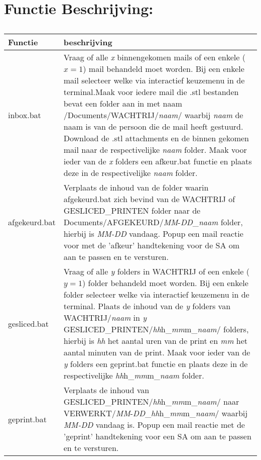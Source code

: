 \documentclass{article}
\begin{document}
\section*{\hspace{-1cm}Functie Beschrijving:}
\begin{table}[H]
    \centering
    \begin{tabular}%
    {>{\raggedright\arraybackslash}p{}%
    |>{\raggedright\arraybackslash}p{}}
    \rowcolor{myblue}
    Functie & beschrijving\\\hline
    inbox.bat & Vraag of alle \textit{x} binnengekomen mails of een enkele ($x=1$) mail behandeld moet worden. Bij een enkele mail selecteer welke via interactief keuzemenu in de terminal.\newline Maak voor iedere mail die .stl bestanden bevat een folder aan in met naam /Documents/WACHTRIJ/\textit{naam}/ waarbij \textit{naam} de naam is van de persoon die de mail heeft gestuurd. Download de .stl attachments en de binnen gekomen mail naar de respectivelijke \textit{naam} folder. Maak voor ieder van de \textit{x} folders een afkeur.bat functie en plaats deze in de respectivelijke \textit{naam} folder.\\


    afgekeurd.bat & Verplaats de inhoud van de folder waarin afgekeurd.bat zich bevind van de WACHTRIJ of GESLICED\_PRINTEN folder naar de Documents/AFGEKEURD/\textit{MM}-\textit{DD}\_\textit{naam} folder, hierbij is \textit{MM-DD} vandaag. Popup een mail reactie voor met de 'afkeur' handtekening voor de SA om aan te passen en te versturen.\\
    gesliced.bat & Vraag of alle \textit{y} folders in WACHTRIJ of een enkele ($y=1$) folder behandeld moet worden. Bij een enkele folder selecteer welke via interactief keuzemenu in de terminal. Plaats de inhoud van de \textit{y} folders van WACHTRIJ/\textit{naam} in \textit{y} GESLICED\_PRINTEN/\textit{hh}h\_\textit{mm}m\_\textit{naam}/ folders, hierbij is \textit{hh} het aantal uren van de print en \textit{mm} het aantal minuten van de print.
    Maak voor ieder van de \textit{y} folders een geprint.bat functie en plaats deze in de respectivelijke \textit{hh}h\_\textit{mm}m\_\textit{naam} folder.
    \\
    geprint.bat & Verplaats de inhoud van GESLICED\_PRINTEN/\textit{hh}h\_\textit{mm}m\_\textit{naam}/ naar VERWERKT/\textit{MM}-\textit{DD}\_\textit{hh}h\_\textit{mm}m\_\textit{naam}/ waarbij \textit{MM-DD} vandaag is. Popup een mail reactie met de 'geprint' handtekening voor een SA om aan te passen en te versturen.\\
    \end{tabular}
    \caption*{}%
    \label{}
\end{table}
\end{document}
